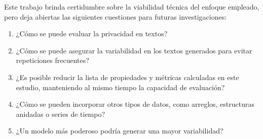 Este trabajo brinda certidumbre sobre la viabilidad técnica del enfoque empleado, pero deja abiertas las siguientes cuestiones para futuras investigaciones:

\begin{enumerate}
    \item ¿Cómo se puede evaluar la privacidad en textos?
    \item ¿Cómo se puede asegurar la variabilidad en los textos generados para evitar repeticiones frecuentes?
    \item ¿Es posible reducir la lista de propiedades y métricas calculadas en este estudio, manteniendo al mismo tiempo la capacidad de evaluación?
    \item ¿Cómo se pueden incorporar otros tipos de datos, como arreglos, estructuras anidadas o series de tiempo?
    \item ¿Un modelo más poderoso podría generar una mayor variabilidad?
\end{enumerate}

